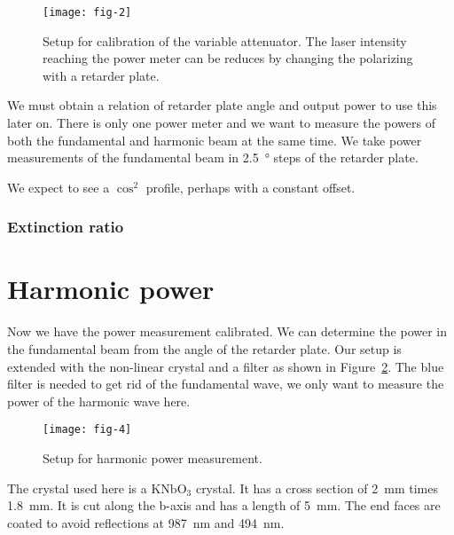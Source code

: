 \documentclass[11pt, english, fleqn, DIV=15, headinclude, BCOR=2cm]{scrreprt}
\begin{document}
\begin{figure}
    \centering
    \texttt{[image: fig-2]}
    \caption{%
        Setup for calibration of the variable attenuator. The laser intensity
        reaching the power meter can be reduces by changing the polarizing with
        a retarder plate. \parencite[Figure~2]{lab-course/doubling/manual}
    }
    \label{fig:fig-2}
\end{figure}

We must obtain a relation of retarder plate angle and output power to use this
later on. There is only one power meter and we want to measure the powers of
both the fundamental and harmonic beam at the same time. We take power
measurements of the fundamental beam in \SI{2.5}{\degree} steps of the retarder
plate.


We expect to see a $\cos^2$ profile, perhaps with a constant offset.


\subsubsection{Extinction ratio}


\section{Harmonic power}

Now we have the power measurement calibrated. We can determine the power in the
fundamental beam from the angle of the retarder plate. Our setup is extended
with the non-linear crystal and a filter as shown in Figure~\ref{fig:fig-4}.
The blue filter is needed to get rid of the fundamental wave, we only want to
measure the power of the harmonic wave here.

\begin{figure}
    \centering
    \texttt{[image: fig-4]}
    \caption{%
        Setup for harmonic power measurement.
        \parencite[Figure~4]{lab-course/doubling/manual}
    }
    \label{fig:fig-4}
\end{figure}

The crystal used here is a $\mathrm{KNbO_3}$ crystal. It has a cross section of
\SI{2}{\milli\meter} times \SI{1.8}{\milli\meter}. It is cut along the b-axis
and has a length of \SI{5}{\milli\meter}. The end faces are coated to avoid
reflections at \SI{987}{\nano\meter} and \SI{494}{\nano\meter}.
\parencite[6]{lab-course/doubling/manual}
\end{document}
